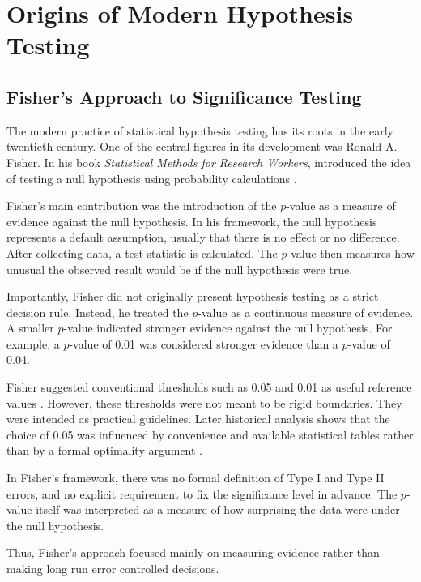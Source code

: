 
\chapter{Origins of Modern Hypothesis Testing}
\label{chapter:history}
\section{Fisher’s Approach to Significance Testing}

The modern practice of statistical hypothesis testing has its roots in the early twentieth century. One of the central figures in its development was Ronald A. Fisher. In his book \emph{Statistical Methods for Research Workers}, introduced the idea of testing a null hypothesis using probability calculations \cite{Fisher1925}.

Fisher’s main contribution was the introduction of the $p$-value as a measure of evidence against the null hypothesis. In his framework, the null hypothesis represents a default assumption, usually that there is no effect or no difference. After collecting data, a test statistic is calculated. The $p$-value then measures how unusual the observed result would be if the null hypothesis were true.

Importantly, Fisher did not originally present hypothesis testing as a strict decision rule. Instead, he treated the $p$-value as a continuous measure of evidence. A smaller $p$-value indicated stronger evidence against the null hypothesis. For example, a $p$-value of 0.01 was considered stronger evidence than a $p$-value of 0.04.

Fisher suggested conventional thresholds such as 0.05 and 0.01 as useful reference values \cite{Fisher1925}. However, these thresholds were not meant to be rigid boundaries. They were intended as practical guidelines. Later historical analysis shows that the choice of 0.05 was influenced by convenience and available statistical tables rather than by a formal optimality argument \cite{CowlesDavis1982}.

In Fisher’s framework, there was no formal definition of Type I and Type II errors, and no explicit requirement to fix the significance level in advance. The $p$-value itself was interpreted as a measure of how surprising the data were under the null hypothesis.

Thus, Fisher’s approach focused mainly on measuring evidence rather than making long run error controlled decisions.


